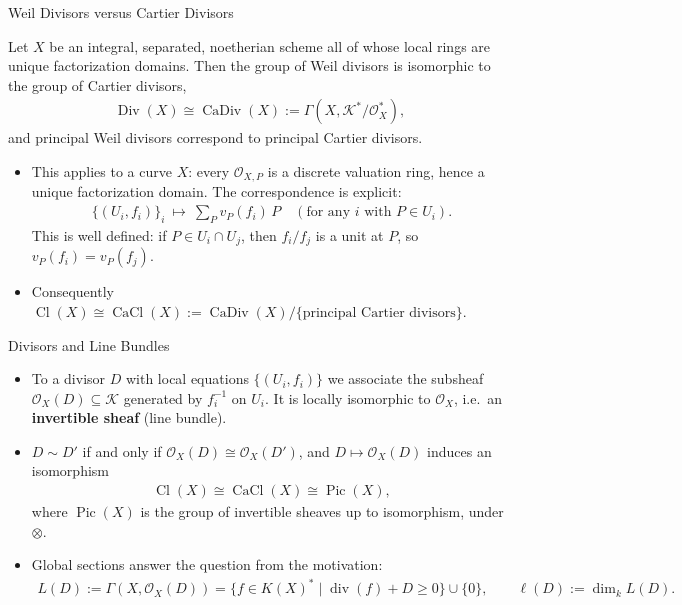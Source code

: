 \documentclass[10pt,aspectratio=1610]{beamer}
\DeclareMathOperator{\Div}{Div}
\DeclareMathOperator{\CaDiv}{CaDiv}
\DeclareMathOperator{\Cl}{Cl}
\DeclareMathOperator{\CaCl}{CaCl}
\DeclareMathOperator{\Pic}{Pic}
\DeclareMathOperator{\divv}{div}
\newcommand{\OO}{\mathcal{O}}
\newcommand{\KK}{\mathcal{K}}
\begin{document}
    \begin{frame}{Weil Divisors versus Cartier Divisors}
        \begin{theorem}
            Let $X$ be an integral, separated, noetherian scheme all of whose local rings are unique factorization domains. Then the group of Weil divisors is isomorphic to the group of Cartier divisors,
            \begin{align*}
                \Div(X) \cong \CaDiv(X) := \Gamma(X, \KK^*/\OO_X^*),
            \end{align*}
            and principal Weil divisors correspond to principal Cartier divisors.
        \end{theorem}
        \begin{itemize}
            \item This applies to a curve $X$: every $\OO_{X,P}$ is a discrete valuation ring, hence a unique factorization domain. The correspondence is explicit:
            \begin{align*}
                \{(U_i, f_i)\}_i \ \longmapsto\ \sum_{P} v_P(f_{i})\, P \quad (\text{for any } i \text{ with } P \in U_i).
            \end{align*}
            This is well defined: if $P \in U_i \cap U_j$, then $f_i/f_j$ is a unit at $P$, so $v_P(f_i) = v_P(f_j)$.
            \item Consequently $\Cl(X) \cong \CaCl(X) := \CaDiv(X)/\{\text{principal Cartier divisors}\}$.
        \end{itemize}
    \end{frame}

    \begin{frame}{Divisors and Line Bundles}
        \begin{itemize}
            \item To a divisor $D$ with local equations $\{(U_i, f_i)\}$ we associate the subsheaf $\OO_X(D) \subseteq \KK$ generated by $f_i^{-1}$ on $U_i$. It is locally isomorphic to $\OO_X$, i.e.\ an \textbf{invertible sheaf} (line bundle).
            \item $D \sim D'$ if and only if $\OO_X(D) \cong \OO_X(D')$, and $D \mapsto \OO_X(D)$ induces an isomorphism
            \begin{align*}
                \Cl(X) \cong \CaCl(X) \cong \Pic(X),
            \end{align*}
            where $\Pic(X)$ is the group of invertible sheaves up to isomorphism, under $\otimes$.
            \item Global sections answer the question from the motivation:
            \begin{align*}
                L(D) := \Gamma(X, \OO_X(D)) = \{f \in K(X)^* \mid \divv(f) + D \geq 0\} \cup \{0\}, \qquad \ell(D) := \dim_k L(D).
            \end{align*}
        \end{itemize}
    \end{frame}
\end{document}
